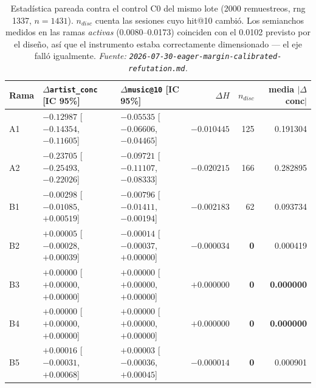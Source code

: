\documentclass[11pt]{article}
\newcommand{\best}[1]{\textbf{#1}}
\begin{document}
\begin{table}[ht]
  \centering
  \caption{Estadística pareada contra el control C0 del mismo lote (\num{2000}
  remuestreos, rng \num{1337}, $n=\num{1431}$). $n_{disc}$ cuenta las sesiones cuyo
  hit@10 cambió. Los semianchos medidos en las ramas \emph{activas}
  (\numrange{0.0080}{0.0173}) coinciden con el \num{0.0102} previsto por el
  diseño, así que el instrumento estaba correctamente dimensionado --- el eje
  falló igualmente.
  \emph{Fuente: \texttt{2026-07-30-eager-margin-calibrated-refutation.md}.}}
  \label{tab:eagermargin-paired}
  {\footnotesize\setlength{\tabcolsep}{4.5pt}\begin{tabular}{lllrrr}
    \toprule
    Rama & $\Delta$\texttt{artist\_conc} [IC 95\%] & $\Delta$\texttt{music@10} [IC 95\%] & $\Delta H$ & $n_{disc}$ & media $|\Delta$conc$|$ \\
    \midrule
    A1 & $-0.12987$ [$-0.14354$, $-0.11605$] & $-0.05535$ [$-0.06606$, $-0.04465$] & $-0.010445$ & 125 & 0.191304 \\
    A2 & $-0.23705$ [$-0.25493$, $-0.22026$] & $-0.09721$ [$-0.11107$, $-0.08333$] & $-0.020215$ & 166 & 0.282895 \\
    B1 & $-0.00298$ [$-0.01085$, $+0.00519$] & $-0.00796$ [$-0.01411$, $-0.00194$] & $-0.002183$ & 62 & 0.093734 \\
    B2 & $+0.00005$ [$-0.00028$, $+0.00039$] & $-0.00014$ [$-0.00037$, $+0.00000$] & $-0.000034$ & \best{0} & 0.000419 \\
    B3 & $+0.00000$ [$+0.00000$, $+0.00000$] & $+0.00000$ [$+0.00000$, $+0.00000$] & $+0.000000$ & \best{0} & \best{0.000000} \\
    B4 & $+0.00000$ [$+0.00000$, $+0.00000$] & $+0.00000$ [$+0.00000$, $+0.00000$] & $+0.000000$ & \best{0} & \best{0.000000} \\
    B5 & $+0.00016$ [$-0.00031$, $+0.00068$] & $+0.00003$ [$-0.00036$, $+0.00045$] & $-0.000014$ & \best{0} & 0.000901 \\
    \bottomrule
  \end{tabular}}
\end{table}
\end{document}
